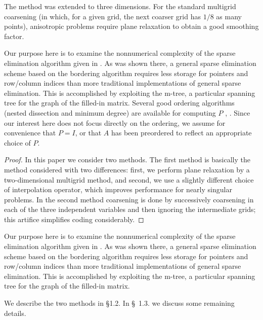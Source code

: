 \documentclass[twoside,leqno,twocolumn]{article}
\begin{document}
\begin{theorem} The method  was extended to three
dimensions. For the standard multigrid
coarsening
(in which, for a given grid, the next coarser grid has $1/8$
as many points), anisotropic problems require plane
relaxation to
obtain a good smoothing factor.\end{theorem} 

Our purpose here is to examine the nonnumerical complexity of the
sparse elimination algorithm given in  \cite{BANKSMITH}.
As was shown there, a general sparse elimination scheme based on the
bordering algorithm requires less storage for pointers and
row/column indices than more traditional implementations of general
sparse elimination.  This is accomplished by exploiting the m-tree,
a particular spanning tree for the graph of the filled-in matrix.
Several good ordering algorithms (nested dissection and minimum degree)
are available for computing $P$  \cite{GEORGELIU}, \cite{ROSE72}.
Since our interest here does not
focus directly on the ordering, we assume for convenience that $P=I$,
or that $A$ has been preordered to reflect an appropriate choice of $P$.

\begin{proof} In this paper we consider two methods. The first method
is
basically the method considered with two differences:
first, we perform plane relaxation by a two-dimensional
multigrid method, and second, we use a slightly different
choice of
interpolation operator, which improves performance
for nearly singular problems. In the second method coarsening
is done by successively coarsening in each of the three
independent variables and then ignoring the intermediate
grids; this artifice simplifies coding considerably.
\end{proof}

Our purpose here is to examine the nonnumerical complexity of the
sparse elimination algorithm given in  \cite{BANKSMITH}.
As was shown there, a general sparse elimination scheme based on the
bordering algorithm requires less storage for pointers and
row/column indices than more traditional implementations of general
sparse elimination.  This is accomplished by exploiting the m-tree,
a particular spanning tree for the graph of the filled-in matrix.

\begin{Definition}{\rm We describe the two methods in \S 1.2. In \S\ 1.3. we
discuss
some remaining details.}
\end{Definition}
\end{document}
